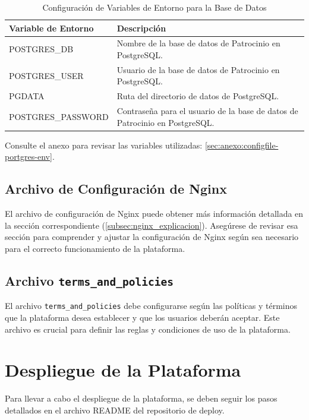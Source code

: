 \begin{table}[H]
    \centering
    \begin{tabular}{|l|p{9cm}|}
    \hline
    \textbf{Variable de Entorno} & \textbf{Descripción} \\
    \hline
    POSTGRES\_DB & Nombre de la base de datos de Patrocinio en PostgreSQL. \\
    \hline
    POSTGRES\_USER & Usuario de la base de datos de Patrocinio en PostgreSQL. \\
    \hline
    PGDATA & Ruta del directorio de datos de PostgreSQL. \\
    \hline
    POSTGRES\_PASSWORD & Contraseña para el usuario de la base de datos de Patrocinio en PostgreSQL. \\
    \hline
    \end{tabular}
    \caption{Configuración de Variables de Entorno para la Base de Datos}
    \label{tab:database-env-variables}
\end{table}


Consulte el anexo para revisar las variables utilizadas: \ref{sec:anexo:configfile-portgres-env}.

\subsection{Archivo de Configuración de Nginx}

El archivo de configuración de Nginx puede obtener más información detallada en la sección correspondiente (\ref{subsec:nginx_explicacion}). Asegúrese de revisar esa sección para comprender y ajustar la configuración de Nginx según sea necesario para el correcto funcionamiento de la plataforma.

\subsection{Archivo \texttt{terms\_and\_policies}}

El archivo \texttt{terms\_and\_policies} debe configurarse según las políticas y términos que la plataforma desea establecer y que los usuarios deberán aceptar. Este archivo es crucial para definir las reglas y condiciones de uso de la plataforma.


\section{Despliegue de la Plataforma}

Para llevar a cabo el despliegue de la plataforma, se deben seguir los pasos detallados en el archivo README del repositorio de deploy.


